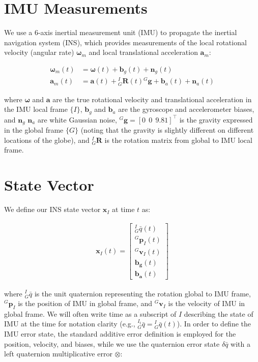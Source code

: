 \hypertarget{propagation_imu_measurements}{}\section{I\+M\+U Measurements}\label{propagation_imu_measurements}
We use a 6-\/axis inertial measurement unit (I\+MU) to propagate the inertial navigation system (I\+NS), which provides measurements of the local rotational velocity (angular rate) $\boldsymbol{\omega}_m$ and local translational acceleration $\mathbf{a}_m$\+:

\begin{align*} \boldsymbol{\omega}_m(t) &= \boldsymbol{\omega}(t) + \mathbf{b}_{g}(t) + \mathbf{n}_{{g}}(t)\\ \mathbf{a}_m(t) &= \mathbf{a}(t) + {}^I_G\mathbf{R}(t) {^G\mathbf{g}} + \mathbf{b}_{a}(t) + \mathbf{n}_{{a}}(t) \end{align*}

where $\boldsymbol{\omega}$ and $\mathbf{a}$ are the true rotational velocity and translational acceleration in the I\+MU local frame $\{I\}$, $\mathbf{b}_{g}$ and $\mathbf{b}_{a}$ are the gyroscope and accelerometer biases, and $\mathbf{n}_{{g}}$ $\mathbf{n}_{{a}}$ are white Gaussian noise, ${^G\mathbf{g}} = [ 0 ~~ 0 ~~ 9.81 ]^\top$ is the gravity expressed in the global frame $\{G\}$ (noting that the gravity is slightly different on different locations of the globe), and $^I_G\mathbf{R}$ is the rotation matrix from global to I\+MU local frame.\hypertarget{propagation_ins_state}{}\section{State Vector}\label{propagation_ins_state}
We define our I\+NS state vector $\mathbf{x}_I$ at time $t$ as\+:

\begin{align*} \mathbf{x}_I(t) = \begin{bmatrix} ^I_G\bar{q}(t) \\ ^G\mathbf{p}_I(t) \\ ^G\mathbf{v}_I(t)\\ \mathbf{b}_{\mathbf{g}}(t) \\ \mathbf{b}_{\mathbf{a}}(t) \end{bmatrix} \end{align*}

where $^I_G\bar{q}$ is the unit quaternion representing the rotation global to I\+MU frame, $^G\mathbf{p}_I$ is the position of I\+MU in global frame, and $^G\mathbf{v}_I$ is the velocity of I\+MU in global frame. We will often write time as a subscript of $I$ describing the state of I\+MU at the time for notation clarity (e.\+g., $^{I_t}_G\bar{q} = \text{}^I_G\bar{q}(t)$). In order to define the I\+MU error state, the standard additive error definition is employed for the position, velocity, and biases, while we use the quaternion error state $\delta \bar{q}$ with a left quaternion multiplicative error $\otimes$\+:

